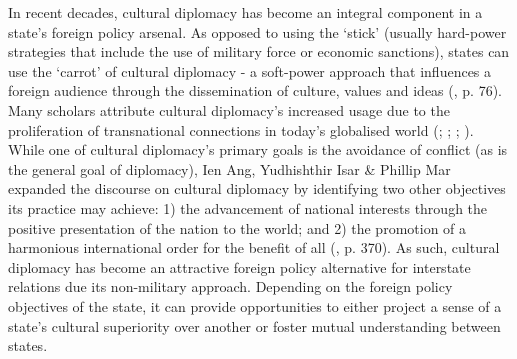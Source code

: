 In recent decades, cultural diplomacy has become an integral component in a state’s foreign policy arsenal. As opposed to using the ‘stick’ (usually hard-power strategies that include the use of military force or economic sanctions), states can use the ‘carrot’ of cultural diplomacy - a soft-power approach that influences a foreign audience through the dissemination of culture, values and ideas (\cite{lenczowski2009}, p. 76). Many scholars attribute cultural diplomacy’s increased usage due to the proliferation of transnational connections in today’s globalised world (\cite{snow2008}; \cite{ang2015}; \cite{chitty2016}; \cite{hartig2016}). While one of cultural diplomacy’s primary goals is the avoidance of conflict (as is the general goal of diplomacy), Ien Ang, Yudhishthir Isar \& Phillip Mar expanded the discourse on cultural diplomacy by identifying two other objectives its practice may achieve:  1) the advancement of national interests through the positive presentation of the nation to the world; and 2) the promotion of a harmonious international order for the benefit of all (\citeyear{ang2015}, p. 370). As such, cultural diplomacy has become an attractive foreign policy alternative for interstate relations due its non-military approach. Depending on the foreign policy objectives of the state, it can provide opportunities to either project a sense of a state’s cultural superiority over another or foster mutual understanding between states.

